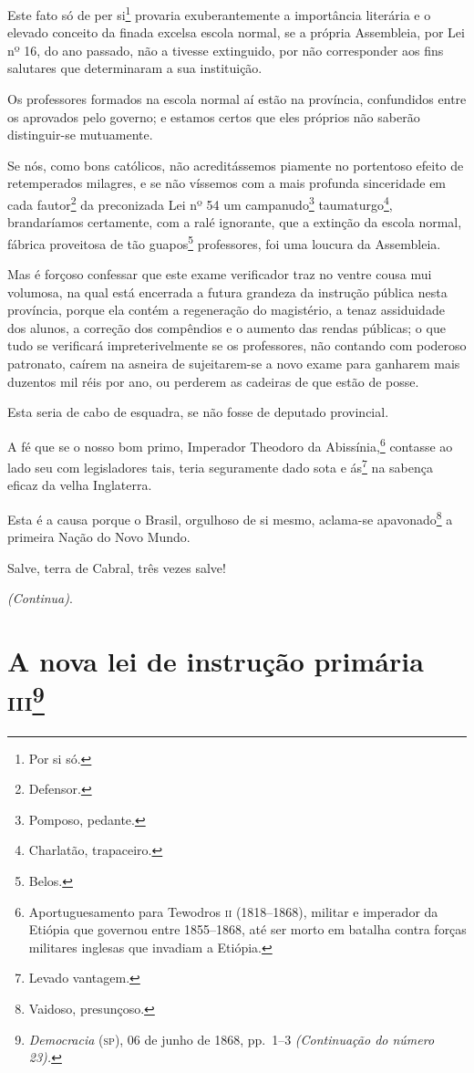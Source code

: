 Este fato só de per si\footnote{Por si só.} provaria exuberantemente a
importância literária e o elevado conceito da finada excelsa escola
normal, se a própria Assembleia, por Lei nº 16, do ano passado, não a
tivesse extinguido, por não corresponder aos fins salutares que
determinaram a sua instituição.

Os professores formados na escola normal aí estão na província,
confundidos entre os aprovados pelo governo; e estamos certos que eles
próprios não saberão distinguir-se mutuamente.

Se nós, como bons católicos, não acreditássemos piamente no portentoso
efeito de retemperados milagres, e se não víssemos com a mais profunda
sinceridade em cada fautor\footnote{Defensor.} da preconizada Lei nº
54 um campanudo\footnote{Pomposo, pedante.} taumaturgo\footnote{
  Charlatão, trapaceiro.}, brandaríamos certamente, com a ralé
ignorante, que a extinção da escola normal, fábrica proveitosa de tão
guapos\footnote{Belos.} professores, foi uma loucura da Assembleia.

Mas é forçoso confessar que este exame verificador traz no ventre cousa
mui volumosa, na qual está encerrada a futura grandeza da instrução
pública nesta província, porque ela contém a regeneração do magistério,
a tenaz assiduidade dos alunos, a correção dos compêndios e o aumento
das rendas públicas; o que tudo se verificará impreterivelmente se os
professores, não contando com poderoso patronato, caírem na asneira de
sujeitarem-se a novo exame para ganharem mais duzentos mil réis por ano,
ou perderem as cadeiras de que estão de posse.

Esta seria de cabo de esquadra, se não fosse de deputado provincial.

A fé que se o nosso bom primo, Imperador Theodoro da
Abissínia,\footnote{Aportuguesamento para Tewodros \textsc{ii} (1818--1868),
  militar e imperador da Etiópia que governou entre 1855--1868, até ser
  morto em batalha contra forças militares inglesas que invadiam a
  Etiópia.} contasse ao lado seu com legisladores tais, teria
seguramente dado sota e ás\footnote{Levado vantagem.} na sabença
eficaz da velha Inglaterra.

Esta é a causa porque o Brasil, orgulhoso de si mesmo, aclama-se
apavonado\footnote{Vaidoso, presunçoso.} a primeira Nação do Novo
Mundo.

Salve, terra de Cabral, três vezes salve!

\emph{(Continua)}.

\chapter{A nova lei de instrução primária \textsc{iii}\footnote{\emph{Democracia} (\textsc{sp}), 06 de junho de 1868, pp.~1--3 \emph{(Continuação do
  número 23).}}}

